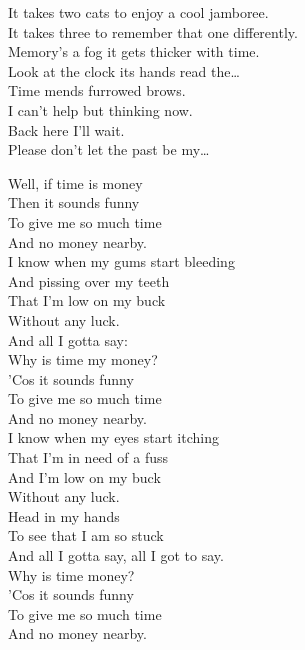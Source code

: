 It takes two cats to enjoy a cool jamboree. \\
It takes three to remember that one differently. \\
Memory's a fog it gets thicker with time. \\
Look at the clock its hands read the… \\

Time mends furrowed brows. \\
I can't help but thinking now. \\
Back here I'll wait. \\
Please don't let the past be my… \\




Well, if time is money \\
Then it sounds funny \\
To give me so much time \\
And no money nearby. \\

I know when my gums start bleeding \\
And pissing over my teeth \\
That I'm low on my buck \\
Without any luck. \\
And all I gotta say: \\

Why is time my money? \\
'Cos it sounds funny \\
To give me so much time \\
And no money nearby. \\

I know when my eyes start itching \\
That I'm in need of a fuss \\
And I'm low on my buck \\
Without any luck. \\
Head in my hands \\
To see that I am so stuck \\
And all I gotta say, all I got to say. \\

Why is time money? \\
'Cos it sounds funny \\
To give me so much time \\
And no money nearby. \\

